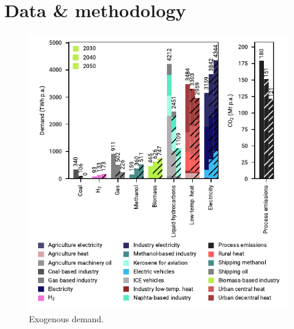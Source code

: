 \documentclass[preprint,12pt,sort&compress]{elsarticle}
\begin{document}
\appendix

\section{Data \& methodology}
\label{app:data_methodology}

\begin{figure}[htbp]
  \centering
  \includegraphics{exogenous_demand.pdf}
  \caption{Exogenous demand.}
  \label{fig:exogenous_demand}
\end{figure}
\end{document}
